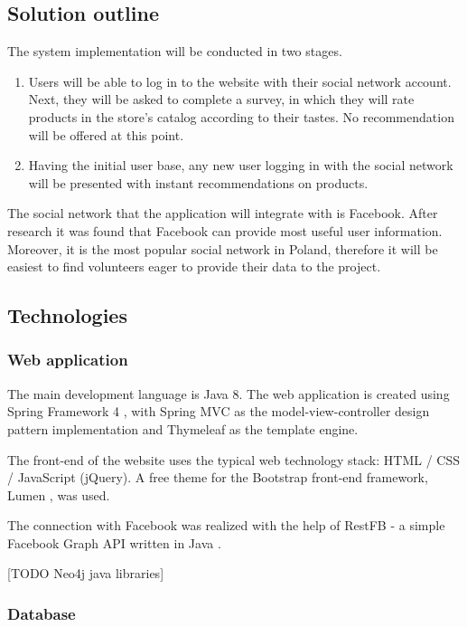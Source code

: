 \documentclass[12pt]{report}
\begin{document}
\subsection{Solution outline}

The system implementation will be conducted in two stages.
\begin{enumerate}
\item Users will be able to log in to the website with their social network account. Next, they will be asked to complete a survey, in which they will rate products in the store's catalog according to their tastes. No recommendation will be offered at this point.
\item Having the initial user base, any new user logging in with the social network will be presented with instant recommendations on products.
\end{enumerate}

The social network that the application will integrate with is Facebook. After research it was found that Facebook can provide most useful user information. Moreover, it is the most popular social network in Poland, therefore it will be easiest to find volunteers eager to provide their data to the project.

\subsection{Technologies}
\subsubsection{Web application}
The main development language is Java 8. The web application is created using Spring Framework 4 \cite{spring_framework}, with Spring MVC as the model-view-controller design pattern implementation and Thymeleaf as the template engine. 

The front-end of the website uses the typical web technology stack: HTML / CSS / JavaScript (jQuery). A free theme for the Bootstrap front-end framework, Lumen \cite{lumen}, was used.

The connection with Facebook was realized with the help of RestFB - a simple Facebook Graph API written in Java \cite{restfb}.

\hbox{}
[TODO Neo4j java libraries]

\subsubsection{Database}
\end{document}
